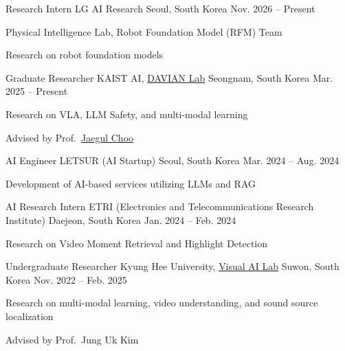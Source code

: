 
\begin{cventries}

  \cventry
    {Research Intern}
    {LG AI Research}
    {Seoul, South Korea}
    {Nov. 2026 -- Present}
    {%
      \begin{cvitems}
        \item Physical Intelligence Lab, Robot Foundation Model (RFM) Team
        \item Research on robot foundation models
      \end{cvitems}
    }

  \cventry
    {Graduate Researcher}
    {KAIST AI, \href{https://davian.kaist.ac.kr/}{DAVIAN Lab}}
    {Seongnam, South Korea}
    {Mar. 2025 -- Present}
    {%
      \begin{cvitems}
        \item Research on VLA, LLM Safety, and multi-modal learning
        \item Advised by Prof.\ \href{https://sites.google.com/site/jaegulchoo/}{Jaegul Choo}
      \end{cvitems}
    }

  \cventry
    {AI Engineer}
    {LETSUR (AI Startup)}
    {Seoul, South Korea}
    {Mar. 2024 -- Aug. 2024}
    {%
      \begin{cvitems}
        \item Development of AI-based services utilizing LLMs and RAG
      \end{cvitems}
    }

  \cventry
    {AI Research Intern}
    {ETRI (Electronics and Telecommunications Research Institute)}
    {Daejeon, South Korea}
    {Jan. 2024 -- Feb. 2024}
    {%
      \begin{cvitems}
        \item Research on Video Moment Retrieval and Highlight Detection
      \end{cvitems}
    }

  \cventry
    {Undergraduate Researcher}
    {Kyung Hee University, \href{https://visualai.khu.ac.kr/}{Visual AI Lab}}
    {Suwon, South Korea}
    {Nov. 2022 -- Feb. 2025}
    {%
      \begin{cvitems}
        \item Research on multi-modal learning, video understanding, and sound source localization
        \item Advised by Prof.\ Jung Uk Kim
      \end{cvitems}
    }

\end{cventries}
